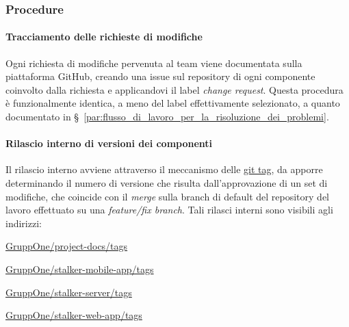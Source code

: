 \documentclass[../../norme-di-progetto.tex]{subfiles}
\begin{document}
\subsubsection{Procedure}%
\label{subs:gestione_della_configurazione/procedure}

\paragraph{Tracciamento delle richieste di modifiche}%
\label{par:tracciamento_delle_richieste_di_modifiche}

Ogni richiesta di modifiche pervenuta al team viene documentata sulla piattaforma GitHub, creando una issue sul repository di ogni componente coinvolto dalla richiesta e applicandovi il label \textit{change request}.
Questa procedura è funzionalmente identica, a meno del label effettivamente selezionato, a quanto documentato in §~\ref{par:flusso_di_lavoro_per_la_risoluzione_dei_problemi}.


\paragraph{Rilascio interno di versioni dei componenti}%
\label{par:rilascio_interno_di_versioni_dei_componenti}

Il rilascio interno avviene attraverso il meccanismo delle \href{https://git-scm.com/book/en/v2/Git-Basics-Tagging}{git tag}, da apporre determinando il numero di versione che risulta dall'approvazione di un set di modifiche, che coincide con il \textit{merge} sulla branch di default del repository del lavoro effettuato su una \textit{feature/fix branch}. Tali rilasci interni sono visibili agli indirizzi:

\begin{description}
  \item \href{https://github.com/GruppOne/project-docs/tags}{GruppOne/project-docs/tags}
  \item \href{https://github.com/GruppOne/stalker-mobile-app/tags}{GruppOne/stalker-mobile-app/tags}
  \item \href{https://github.com/GruppOne/stalker-server/tags}{GruppOne/stalker-server/tags}
  \item \href{https://github.com/GruppOne/stalker-web-app/tags}{GruppOne/stalker-web-app/tags}
\end{description}

\end{document}
